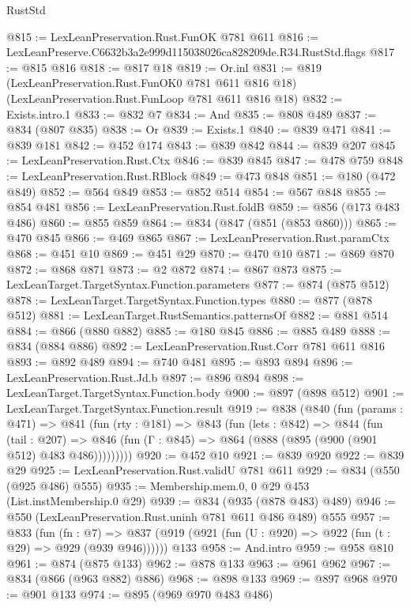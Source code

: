 \begin{lexlean}{RustStd}
\begin{coremodule}
@815 := LexLeanPreservation.Rust.FunOK @781 @611
@816 := LexLeanPreserve.C6632b3a2e999d115038026ca828209de.R34.RustStd.flags
@817 := @815 @816
@818 := @817 @18
@819 := Or.inl
@831 := @819
    (LexLeanPreservation.Rust.FunOK0 @781 @611 @816 @18)
    (LexLeanPreservation.Rust.FunLoop @781 @611 @816 @18)
@832 := Exists.intro.{1}
@833 := @832 @7
@834 := And
@835 := @808 @489
@837 := @834 (@807 @835)
@838 := Or
@839 := Exists.{1}
@840 := @839 @471
@841 := @839 @181
@842 := @452 @174
@843 := @839 @842
@844 := @839 @207
@845 := LexLeanPreservation.Rust.Ctx
@846 := @839 @845
@847 := @478 @759
@848 := LexLeanPreservation.Rust.RBlock
@849 := @473 @848
@851 := @180 (@472 @849)
@852 := @564 @849
@853 := @852 @514
@854 := @567 @848
@855 := @854 @481
@856 := LexLeanPreservation.Rust.foldB
@859 := @856 (@173 @483 @486)
@860 := @855 @859
@864 := @834 (@847 (@851 (@853 @860)))
@865 := @470 @845
@866 := @469 @865
@867 := LexLeanPreservation.Rust.paramCtx
@868 := @451 @10
@869 := @451 @29
@870 := @470 @10
@871 := @869 @870
@872 := @868 @871
@873 := @2 @872
@874 := @867 @873
@875 := LexLeanTarget.TargetSyntax.Function.parameters
@877 := @874 (@875 @512)
@878 := LexLeanTarget.TargetSyntax.Function.types
@880 := @877 (@878 @512)
@881 := LexLeanTarget.RustSemantics.patternsOf
@882 := @881 @514
@884 := @866 (@880 @882)
@885 := @180 @845
@886 := @885 @489
@888 := @834 (@884 @886)
@892 := LexLeanPreservation.Rust.Corr @781 @611 @816
@893 := @892 @489
@894 := @740 @481
@895 := @893 @894
@896 := LexLeanPreservation.Rust.Jd.b
@897 := @896 @894
@898 := LexLeanTarget.TargetSyntax.Function.body
@900 := @897 (@898 @512)
@901 := LexLeanTarget.TargetSyntax.Function.result
@919 := @838
    (@840
      (fun (params : @471) =>
      @841
        (fun (rty : @181) =>
        @843
          (fun (lets : @842) =>
          @844
            (fun (tail : @207) =>
            @846 (fun (Γ : @845) => @864 (@888 (@895 (@900 (@901 @512) @483 @486)))))))))
@920 := @452 @10
@921 := @839 @920
@922 := @839 @29
@925 := LexLeanPreservation.Rust.validU @781 @611
@929 := @834 (@550 (@925 @486) @555)
@935 := Membership.mem.{0, 0} @29 @453 (List.instMembership.{0} @29)
@939 := @834 (@935 (@878 @483) @489)
@946 := @550 (LexLeanPreservation.Rust.uninh @781 @611 @486 @489) @555
@957 := @833
    (fun (fn : @7) =>
    @837 (@919 (@921 (fun (U : @920) => @922 (fun (t : @29) => @929 (@939 @946))))))
    @133
@958 := And.intro
@959 := @958 @810
@961 := @874 (@875 @133)
@962 := @878 @133
@963 := @961 @962
@967 := @834 (@866 (@963 @882) @886)
@968 := @898 @133
@969 := @897 @968
@970 := @901 @133
@974 := @895 (@969 @970 @483 @486)

\end{coremodule}
\end{lexlean}

